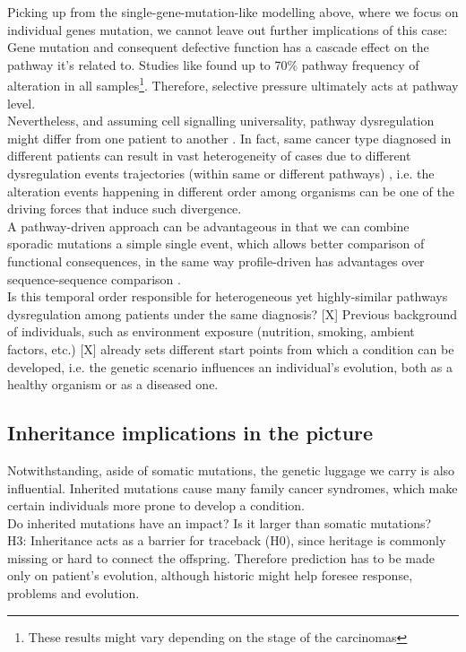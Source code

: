 Picking up from the single-gene-mutation-like modelling above, where we focus on individual genes mutation, we cannot leave out further implications of this case: Gene mutation and consequent defective function has a cascade effect on the pathway it's related to. Studies like \cite{Gerstung2011TheTumorigenesis} found up to 70\% pathway frequency of alteration in all samples\footnote{These results might vary depending on the stage of the carcinomas}. Therefore, selective pressure ultimately acts at pathway level.
\\

Nevertheless, and assuming cell signalling universality, pathway dysregulation might differ from one patient to another \cite{Ulitsky2010DEGAS:Diseases}. In fact, same cancer type diagnosed in different patients can result in vast heterogeneity of cases due to different dysregulation events trajectories (within same or different pathways) \cite{Khakabimamaghani2019UncoveringDysregulation}, i.e. the alteration events happening in different order among organisms can be one of the driving forces that induce such divergence.
\\

A pathway-driven approach can be advantageous in that we can combine sporadic mutations a simple single event, which allows better comparison of functional consequences, in the same way profile-driven has advantages over sequence-sequence comparison \cite{Cheng2012AGliomagenesis}.
\\

Is this temporal order responsible for heterogeneous yet highly-similar pathways dysregulation among patients under the same diagnosis? [X]
Previous background of individuals, such as environment exposure (nutrition, smoking, ambient factors, etc.) [X] already sets different start points from which a condition can be developed, i.e. the genetic scenario influences an individual’s evolution, both as a healthy organism or as a diseased one.
\\

\subsection{Inheritance implications in the picture}

Notwithstanding, aside of somatic mutations, the genetic luggage we carry is also influential. Inherited mutations cause many family cancer syndromes, which make certain individuals more prone to develop a condition.
\\

Do inherited mutations have an impact? Is it larger than somatic mutations?
\\

H3: Inheritance acts as a barrier for traceback (H0), since heritage is commonly missing or hard to connect the offspring. Therefore prediction has to be made only on patient’s evolution, although historic might help foresee response, problems and evolution.